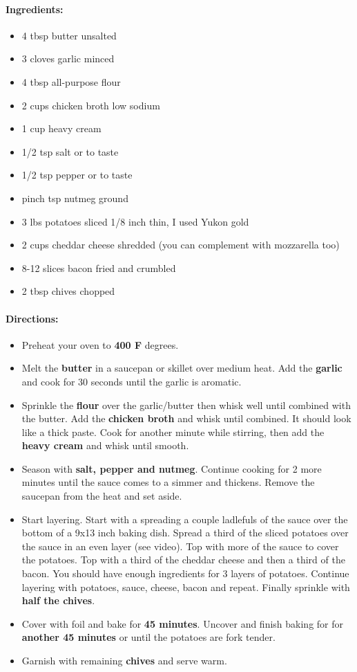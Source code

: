 \documentclass{article}
\begin{document}
\paragraph{Ingredients:}
\begin{itemize}
    \item 4 tbsp butter unsalted
    \item 3 cloves garlic minced
    \item 4 tbsp all-purpose flour
    \item 2 cups chicken broth low sodium
    \item 1 cup heavy cream
    \item 1/2 tsp salt or to taste
    \item 1/2 tsp pepper or to taste
    \item pinch tsp nutmeg ground
    \item 3 lbs potatoes sliced 1/8 inch thin, I used Yukon gold
    \item 2 cups cheddar cheese shredded (you can complement with mozzarella too)
    \item 8-12 slices bacon fried and crumbled
    \item 2 tbsp chives chopped
\end{itemize}

\paragraph{Directions:}
\begin{itemize}
    \item Preheat your oven to \textbf{400 F} degrees.
    \item Melt the \textbf{butter} in a saucepan or skillet over medium heat. Add the \textbf{garlic} and cook for 30 seconds until the garlic is aromatic.
    \item Sprinkle the \textbf{flour} over the garlic/butter then whisk well until combined with the butter. Add the \textbf{chicken broth} and whisk until combined. It should look like a thick paste. Cook for another minute while stirring, then add the \textbf{heavy cream} and whisk until smooth.
    \item Season with \textbf{salt, pepper and nutmeg}. Continue cooking for 2 more minutes until the sauce comes to a simmer and thickens. Remove the saucepan from the heat and set aside.
    \item Start layering. Start with a spreading a couple ladlefuls of the sauce over the bottom of a 9x13 inch baking dish. Spread a third of the sliced potatoes over the sauce in an even layer (see video). Top with more of the sauce to cover the potatoes. Top with a third of the cheddar cheese and then a third of the bacon. You should have enough ingredients for 3 layers of potatoes. Continue layering with potatoes, sauce, cheese, bacon and repeat. Finally sprinkle with \textbf{half the chives}.
    \item Cover with foil and bake for \textbf{45 minutes}. Uncover and finish baking for for \textbf{another 45 minutes} or until the potatoes are fork tender.
    \item Garnish with remaining \textbf{chives} and serve warm.
\end{itemize}
\end{document}
